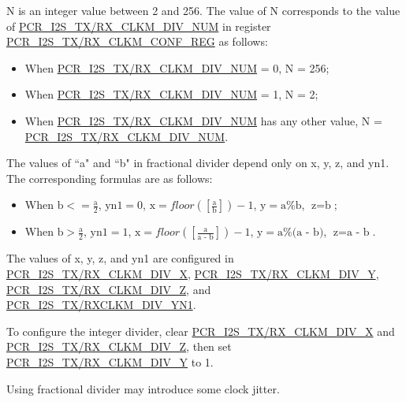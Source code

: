 \documentclass[main\_\_EN.tex]{subfiles}
\begin{document}
N is an integer value between 2 and 256. The value of N corresponds to the value of  \hyperref[fielddesc:PCRI2STXCLKMDIVNUM]{PCR\_I2S\_TX/RX\_CLKM\_DIV\_NUM} in register  \hyperref[regdesc:PCRI2STXCLKMCONFREG]{PCR\_I2S\_TX/RX\_CLKM\_CONF\_REG} as follows:

\begin{itemize}
    \item When  \hyperref[fielddesc:PCRI2STXCLKMDIVNUM]{PCR\_I2S\_TX/RX\_CLKM\_DIV\_NUM} = 0, N = 256;
    \item When  \hyperref[fielddesc:PCRI2STXCLKMDIVNUM]{PCR\_I2S\_TX/RX\_CLKM\_DIV\_NUM} = 1, N = 2;
    \item When  \hyperref[fielddesc:PCRI2STXCLKMDIVNUM]{PCR\_I2S\_TX/RX\_CLKM\_DIV\_NUM} has any other value, N =  \hyperref[fielddesc:PCRI2STXCLKMDIVNUM]{PCR\_I2S\_TX/RX\_CLKM\_DIV\_NUM}.

\end{itemize}

The values of ``a" and ``b" in fractional divider depend only on x, y, z, and yn1. The corresponding formulas are as follows:

\begin{itemize}
    \item When $\textrm{b} <= \frac{\textrm{a}}{2}$, $\textrm{yn1} = 0$, $\textrm{x} = floor([\frac{\textrm{a}}{\textrm{b}}]) - 1$, $\textrm{y} = \textrm{a}\%\textrm{b}$, $\textrm{z} = \textrm{b}$; 
    \item When $\textrm{b} > \frac{\textrm{a}}{2}$, $\textrm{yn1}=1$, $\textrm{x} = floor([\frac{\textrm{a}}{\textrm{a - b}}]) - 1$, $\textrm{y} = \textrm{a}\%\textrm{(a - b)}$, $\textrm{z}=\textrm{a - b}$.
\end{itemize}

The values of x, y, z, and yn1 are configured in \hyperref[fielddesc:PCRI2STXCLKMDIVX]{PCR\_I2S\_TX/RX\_CLKM\_DIV\_X}, \hyperref[fielddesc:PCRI2STXCLKMDIVY]{PCR\_I2S\_TX/RX\_CLKM\_DIV\_Y}, \hyperref[fielddesc:PCRI2STXCLKMDIVZ]{PCR\_I2S\_TX/RX\_CLKM\_DIV\_Z}, and \hyperref[fielddesc:PCRI2STXCLKMDIVYN1]{PCR\_I2S\_TX/RXCLKM\_DIV\_YN1}.

To configure the integer divider, clear \hyperref[fielddesc:PCRI2STXCLKMDIVX]{PCR\_I2S\_TX/RX\_CLKM\_DIV\_X} and \hyperref[fielddesc:PCRI2STXCLKMDIVZ]{PCR\_I2S\_TX/RX\_CLKM\_DIV\_Z}, then set \hyperref[fielddesc:PCRI2STXCLKMDIVY]{PCR\_I2S\_TX/RX\_CLKM\_DIV\_Y} to 1.


\begin{tiplisting}
Using fractional divider may introduce some clock jitter.
\end{tiplisting}
\end{document}
